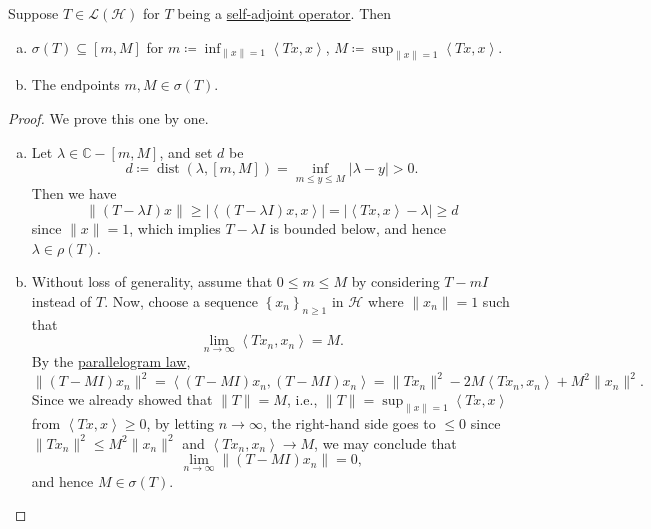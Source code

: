 \begin{theorem}\label{thm:spectrum-interval}
	Suppose \(T \in \mathcal{L} (\mathcal{H} )\) for \(T\) being a \hyperref[def:self-adjoint-op]{self-adjoint operator}. Then
	\begin{enumerate}[(a)]
		\item \(\sigma (T) \subseteq [m, M]\) for \(m\coloneqq \inf _{\lVert x \rVert = 1}\left\langle Tx, x \right\rangle \), \(M\coloneqq \sup _{\lVert x \rVert = 1} \left\langle Tx, x \right\rangle \).
		\item The endpoints \(m, M\in \sigma (T)\).
	\end{enumerate}
\end{theorem}
\begin{proof}
	We prove this one by one.
	\begin{enumerate}[(a)]
		\item Let \(\lambda \in \mathbb{C} -[m, M]\), and set \(d\) be
		      \[
			      d\coloneqq \mathop{\mathrm{dist}}(\lambda , [m, M])
			      = \inf _{m \leq y\leq M} \vert \lambda -y \vert > 0.
		      \]
		      Then we have
		      \[
			      \lVert (T-\lambda I)x \rVert
			      \geq \vert \left\langle (T-\lambda I)x, x \right\rangle  \vert
			      = \vert \left\langle Tx, x \right\rangle - \lambda  \vert
			      \geq d
		      \]
		      since \(\lVert x \rVert = 1\), which implies \(T - \lambda I\) is bounded below, and hence \(\lambda \in \rho (T)\).
		\item Without loss of generality, assume that \(0 \leq m \leq M\) by considering \(T - mI\) instead of \(T\). Now, choose a sequence \(\left\{ x_n \right\} _{n\geq 1}\) in \(\mathcal{H} \) where \(\lVert x_n \rVert = 1\) such that
		      \[
			      \lim_{n \to \infty} \left\langle Tx_n, x_n \right\rangle = M.
		      \]
		      By the \hyperref[lma:parallelogram-law]{parallelogram law},
		      \[
			      \lVert (T-MI)x_n \rVert ^{2}
			      = \left\langle (T-MI)x_n, (T-MI)x_n \right\rangle
			      = \lVert Tx_n \rVert ^2 - 2M\left\langle Tx_n, x_n \right\rangle + M^{2} \lVert x_n \rVert ^{2}.
		      \]
		      Since we already showed that \(\lVert T \rVert = M\), i.e., \(\lVert T \rVert = \sup _{\lVert x \rVert = 1}\left\langle Tx, x \right\rangle \) from \(\left\langle Tx, x \right\rangle \geq 0\), by letting \(n \to \infty \), the right-hand side goes to \(\leq 0\) since \(\lVert Tx_n \rVert ^{2} \leq M^{2} \lVert x_n \rVert ^{2} \) and \(\left\langle Tx_n, x_n \right\rangle \to M\), we may conclude that
		      \[
			      \lim_{n \to \infty} \lVert (T-MI)x_n \rVert = 0,
		      \]
		      and hence \(M\in \sigma (T)\).
	\end{enumerate}
\end{proof}

